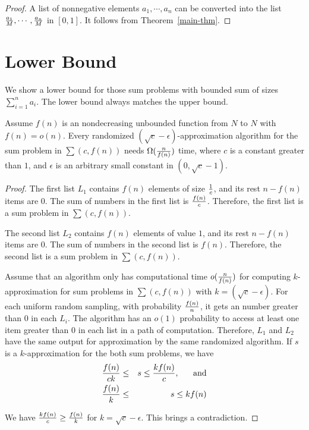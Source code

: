 \documentclass[runningheads]{llncs}
\begin{document}
\begin{proof}
A list of nonnegative elements $a_1,\cdots, a_n$ can be converted
into the list ${a_1\over M},\cdots, {a_n\over M}$ in $[0,1]$. It
follows from Theorem~\ref{main-thm}.
\end{proof}

\section{Lower Bound }

We show a lower bound for those sum problems with bounded sum of
sizes $\sum_{i=1}^n a_i$. The lower bound always matches the upper
bound.


\begin{theorem}\label{strong-lower-bound-theorem}  Assume $f(n)$ is
an nondecreasing unbounded function from $N$ to $N$ with
$f(n)=o(n)$. Every randomized $(\sqrt{c}-\epsilon)$-approximation
algorithm for the sum problem in $\sum(c, f(n))$ needs
$\Omega({n\over f(n)})$ time, where $c$ is a constant greater than
$1$, and $\epsilon$ is an arbitrary small constant in
$(0,\sqrt{c}-1)$.
\end{theorem}

\begin{proof}
The first list $L_1$ contains $f(n)$ elements of size ${1\over c}$,
and its rest $n-f(n)$ items are  $0$. The sum of numbers in the
first list is ${f(n)\over c}$. Therefore, the first list is a sum
problem in $\sum(c,f(n))$.


The second list $L_2$ contains $f(n)$ elements of value $1$, and its
rest $n-f(n)$ items are  $0$. The sum of numbers in the second list
is $f(n)$. Therefore, the second list is a sum problem in
$\sum(c,f(n))$.


Assume that an algorithm only has computational time $o({n\over
f(n)})$ for computing $k$-approximation for sum problems in $\sum(c,
f(n))$ with $k=(\sqrt{c}-\epsilon)$. For each uniform random
sampling, with probability ${f(n)\over n}$, it gets an number
greater than $0$ in each $L_i$. The algorithm has an $o(1)$
probability to access at least one item greater than $0$ in each
list in a path of computation. Therefore,  $L_1$ and $L_2$ have the
same output for approximation by the same randomized algorithm.  If
$s$ is a $k$-approximation for the both sum problems, we have
\begin{eqnarray}
{f(n)\over ck}&\le& s\le {kf(n)\over c},\ \ \ \ \ \mbox{and} \\
{f(n)\over k}&\le& s\le kf(n)
\end{eqnarray}

We have ${kf(n)\over c}\ge {f(n)\over k}$ for $k=\sqrt{c}-\epsilon$.
This brings  a contradiction.

\end{proof}
\end{document}

